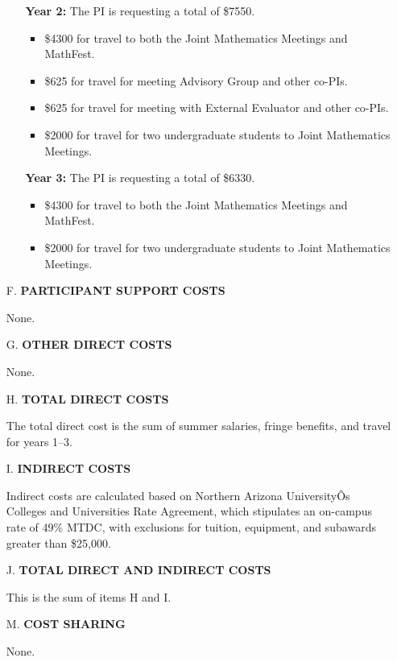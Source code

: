 \documentclass[11pt]{article}
\begin{document}
\begin{enumerate}[leftmargin=*]
\begin{enumerate}
\item[] \textbf{Year 2:} The PI is requesting a total of \$7550.
\begin{itemize}
\item \$4300 for travel to both the Joint Mathematics Meetings and MathFest.
\item \$625 for travel for meeting Advisory Group and other co-PIs.
\item \$625 for travel for meeting with External Evaluator and other co-PIs.
\item \$2000 for travel for two undergraduate students to Joint Mathematics Meetings.
\end{itemize}

\item[] \textbf{Year 3:} The PI is requesting a total of \$6330.
\begin{itemize}
\item \$4300 for travel to both the Joint Mathematics Meetings and MathFest.
\item \$2000 for travel for two undergraduate students to Joint Mathematics Meetings.
\end{itemize} 
\end{enumerate}

\hfill {}

\item[F.] \textbf{PARTICIPANT SUPPORT COSTS}

None. \hfill {}

\item[G.] \textbf{OTHER DIRECT COSTS}

None. \hfill {}

\item[H.] \textbf{TOTAL DIRECT COSTS}

The total direct cost is the sum of summer salaries, fringe benefits, and travel for years 1--3. 

\hfill {}

\item[I.] \textbf{INDIRECT COSTS}

Indirect costs are calculated based on Northern Arizona UniversityÕs Colleges and Universities Rate Agreement, which stipulates an on-campus rate of 49\% MTDC, with exclusions for tuition, equipment, and subawards greater than \$25,000. \hfill {}

\item[J.] \textbf{TOTAL DIRECT AND INDIRECT COSTS}

This is the sum of items H and I. \hfill {}

\item[M.] \textbf{COST SHARING}

None. \hfill {}

\end{enumerate}
\end{document}
